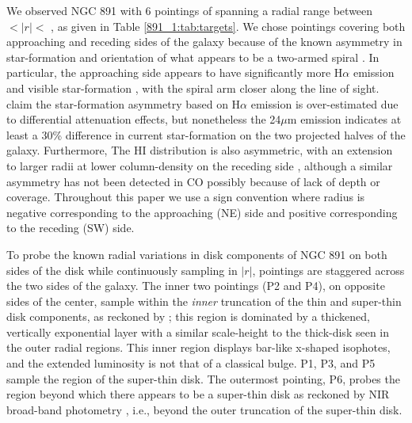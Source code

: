 We observed NGC 891 with 6 pointings of \GP spanning a radial range
between  $< \left|r\right| <$ ,
as given in Table \ref{891_1:tab:targets}. We chose pointings covering
both approaching and receding sides of the galaxy because of the known
asymmetry in star-formation and orientation of what appears to be a
two-armed spiral \citep{Xilouris99,Schechtman-Rook12}. In particular,
the approaching side appears to have significantly more H$\alpha$
emission and visible star-formation \citep{Rand90,Howk00,Kamphuis07a},
with the spiral arm closer along the line of sight. \cite{Kamphuis07b}
claim the star-formation asymmetry based on H$\alpha$ emission is
over-estimated due to differential attenuation effects, but
nonetheless the 24$\mu$m emission indicates at least a 30\% difference
in current star-formation on the two projected halves of the
galaxy. Furthermore, The HI distribution is also asymmetric, with an
extension to larger radii at lower column-density on the receding side
\citep{Swaters97,Oosterloo07}, although a similar asymmetry has not
been detected in CO \citep{Scoville93} possibly because of lack of
depth or coverage. Throughout this paper we use a sign convention
where radius is negative corresponding to the approaching (NE) side
and positive corresponding to the receding (SW) side.

To probe the known radial variations in disk components of NGC 891 on
both sides of the disk while continuously sampling in $|r|$, pointings
are staggered across the two sides of the galaxy. The inner two \GP
pointings (P2 and P4), on opposite sides of the center, sample within
the {\it inner} truncation of the thin and super-thin disk components,
as reckoned by \citet{Schechtman-Rook13}; this region is dominated by
a thickened, vertically exponential layer with a similar scale-height
to the thick-disk seen in the outer radial regions. This inner region
displays bar-like x-shaped isophotes, and the extended luminosity is
not that of a classical bulge. P1, P3, and P5 sample the region of the
super-thin disk. The outermost \GP pointing, P6, probes the region
beyond which there appears to be a super-thin disk as reckoned by NIR
broad-band photometry \citep{Schechtman-Rook12}, i.e., beyond the
outer truncation of the super-thin disk.


